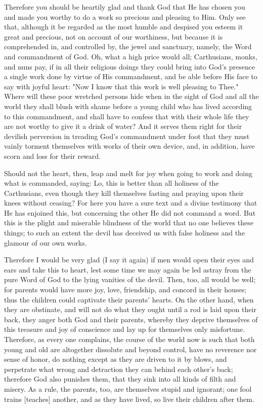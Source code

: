 Therefore you should be heartily glad and thank God that He has chosen
you and made you worthy to do a work so precious and pleasing to Him.
Only see that, although it be regarded as the most humble and despised
you esteem it great and precious, not on account of our worthiness, but
because it is comprehended in, and controlled by, the jewel and
sanctuary, namely, the Word and commandment of God. Oh, what a high
price would all; Carthusians, monks, and nuns pay, if in all their
religious doings they could bring into God's presence a single work
done by virtue of His commandment, and be able before His face to say
with joyful heart: "Now I know that this work is well pleasing to
Thee." Where will these poor wretched persons hide when in the sight of
God and all the world they shall blush with shame before a young child
who has lived according to this commandment, and shall have to confess
that with their whole life they are not worthy to give it a drink of
water? And it serves them right for their devilish perversion in
treading God's commandment under foot that they must vainly torment
themselves with works of their own device, and, in addition, have scorn
and loss for their reward.

Should not the heart, then, leap and melt for joy when going to work
and doing what is commanded, saying: Lo, this is better than all
holiness of the Carthusians, even though they kill themselves fasting
and praying upon their knees without ceasing? For here you have a sure
text and a divine testimony that He has enjoined this, but concerning
the other He did not command a word. But this is the plight and
miserable blindness of the world that no one believes these things; to
such an extent the devil has deceived us with false holiness and the
glamour of our own works.

Therefore I would be very glad (I say it again) if men would open
their eyes and ears and take this to heart, lest some time we may
again be led astray from the pure Word of God to the lying vanities of
the devil. Then, too, all would be well; for parents would have more
joy, love, friendship, and concord in their houses; thus the children
could captivate their parents' hearts. On the other hand, when they are
obstinate, and will not do what they ought until a rod is laid upon
their back, they anger both God and their parents, whereby they deprive
themselves of this treasure and joy of conscience and lay up for
themselves only misfortune. Therefore, as every one complains, the
course of the world now is such that both young and old are altogether
dissolute and beyond control, have no reverence nor sense of honor, do
nothing except as they are driven to it by blows, and perpetrate what
wrong and detraction they can behind each other's back; therefore God
also punishes them, that they sink into all kinds of filth and misery.
As a rule, the parents, too, are themselves stupid and ignorant; one
fool trains [teaches] another, and as they have lived, so live their
children after them.

